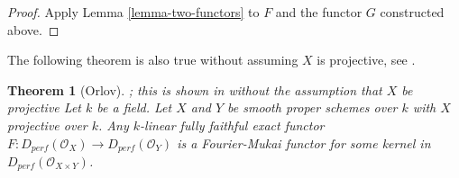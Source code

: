 \documentclass{stacks-project}
\newenvironment{reference}{\comment}{\endcomment}
\theoremstyle{plain}
\newtheorem{theorem}[subsection]{Theorem}
\theoremstyle{definition}
\theoremstyle{remark}
\numberwithin{equation}{subsection}
\begin{document}
\begin{proof}
Apply Lemma \ref{lemma-two-functors} to $F$ and the functor
$G$ constructed above.
\end{proof}

\noindent
The following theorem is also true without assuming $X$ is projective,
see \cite{Noah}.

\begin{theorem}[Orlov]
\label{theorem-fully-faithful}
\begin{reference}
\cite[Theorem 2.2]{Orlov-K3}; this is shown in \cite{Noah}
without the assumption that $X$ be projective
\end{reference}
Let $k$ be a field. Let $X$ and $Y$ be smooth proper schemes over $k$
with $X$ projective over $k$. Any $k$-linear fully faithful exact 
functor $F : D_{perf}(\mathcal{O}_X) \to D_{perf}(\mathcal{O}_Y)$
is a Fourier-Mukai functor for some kernel in
$D_{perf}(\mathcal{O}_{X \times Y})$.
\end{theorem}
\end{document}
